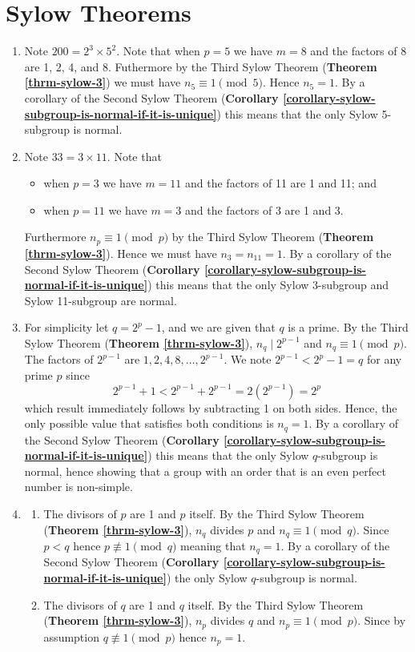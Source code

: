 \section{Sylow Theorems}
\begin{enumerate}
    \item Note $200 = 2^3 \times 5^2$. Note that when $p = 5$ we have $m = 8$ and the factors of 8 are 1, 2, 4, and 8. Futhermore by the Third Sylow Theorem (\textbf{Theorem \ref{thrm-sylow-3}}) we must have $n_5 \equiv 1 \pmod 5$. Hence $n_5 = 1$. By a corollary of the Second Sylow Theorem (\textbf{Corollary \ref{corollary-sylow-subgroup-is-normal-if-it-is-unique}}) this means that the only Sylow 5-subgroup is normal.

    \item Note $33 = 3 \times 11$. Note that
    \begin{itemize}
        \item when $p = 3$ we have $m = 11$ and the factors of 11 are 1 and 11; and
        \item when $p = 11$ we have $m = 3$ and the factors of 3 are 1 and 3.
    \end{itemize}
    Furthermore $n_p \equiv 1 \pmod p$ by the Third Sylow Theorem (\textbf{Theorem \ref{thrm-sylow-3}}). Hence we must have $n_3 = n_{11} = 1$. By a corollary of the Second Sylow Theorem (\textbf{Corollary \ref{corollary-sylow-subgroup-is-normal-if-it-is-unique}}) this means that the only Sylow 3-subgroup and Sylow 11-subgroup are normal.

    \item For simplicity let $q = 2^p - 1$, and we are given that $q$ is a prime. By the Third Sylow Theorem (\textbf{Theorem \ref{thrm-sylow-3}}), $n_q \mid 2^{p-1}$ and $n_q \equiv 1 \pmod p$. The factors of $2^{p-1}$ are $1, 2, 4, 8, \dots, 2^{p-1}$. We note $2^{p-1} < 2^p - 1 = q$ for any prime $p$ since
    \[
        2^{p-1} + 1 < 2^{p-1} + 2^{p-1} = 2(2^{p-1}) = 2^p    
    \]
    which result immediately follows by subtracting 1 on both sides. Hence, the only possible value that satisfies both conditions is $n_q = 1$. By a corollary of the Second Sylow Theorem (\textbf{Corollary \ref{corollary-sylow-subgroup-is-normal-if-it-is-unique}}) this means that the only Sylow $q$-subgroup is normal, hence showing that a group with an order that is an even perfect number is non-simple.

    \item \begin{enumerate}[label=(\roman*)]
        \item The divisors of $p$ are 1 and $p$ itself. By the Third Sylow Theorem (\textbf{Theorem \ref{thrm-sylow-3}}), $n_q$ divides $p$ and $n_q \equiv 1 \pmod q$. Since $p < q$ hence $p \not\equiv 1 \pmod q$ meaning that $n_q = 1$. By a corollary of the Second Sylow Theorem (\textbf{Corollary \ref{corollary-sylow-subgroup-is-normal-if-it-is-unique}}) the only Sylow $q$-subgroup is normal.
        \item The divisors of $q$ are 1 and $q$ itself. By the Third Sylow Theorem (\textbf{Theorem \ref{thrm-sylow-3}}), $n_p$ divides $q$ and $n_p \equiv 1 \pmod p$. Since by assumption $q \not\equiv 1 \pmod p$ hence $n_p = 1$.
        

\end{enumerate}
\end{enumerate}
